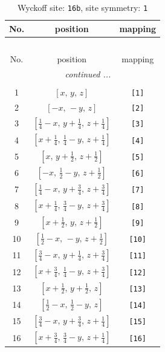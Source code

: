 \documentclass[fleqn,8pt]{jsarticle}
\begin{document}
\begin{longtable}{ccc}
\caption{Wyckoff site: {\tt 16b}, site symmetry: {\tt 1}}
 \\
 \hline \hline
No. & position & mapping \\ \hline \endfirsthead

\multicolumn{2}{l}{\tablename\ \thetable{}} \\
 \hline \hline
No. & position & mapping \\ \hline \endhead

 \hline \hline
\multicolumn{2}{r}{\footnotesize\it continued ...} \\ \endfoot

 \hline \hline
\multicolumn{2}{r}{} \\ \endlastfoot

1 & $\left[ x,\, y,\, z \right]$ & {\tt [1]} \\ \hline
2 & $\left[ - x,\, - y,\, z \right]$ & {\tt [2]} \\ \hline
3 & $\left[ \frac{1}{4} - x,\, y + \frac{1}{4},\, z + \frac{1}{4} \right]$ & {\tt [3]} \\ \hline
4 & $\left[ x + \frac{1}{4},\, \frac{1}{4} - y,\, z + \frac{1}{4} \right]$ & {\tt [4]} \\ \hline
5 & $\left[ x,\, y + \frac{1}{2},\, z + \frac{1}{2} \right]$ & {\tt [5]} \\ \hline
6 & $\left[ - x,\, \frac{1}{2} - y,\, z + \frac{1}{2} \right]$ & {\tt [6]} \\ \hline
7 & $\left[ \frac{1}{4} - x,\, y + \frac{3}{4},\, z + \frac{3}{4} \right]$ & {\tt [7]} \\ \hline
8 & $\left[ x + \frac{1}{4},\, \frac{3}{4} - y,\, z + \frac{3}{4} \right]$ & {\tt [8]} \\ \hline
9 & $\left[ x + \frac{1}{2},\, y,\, z + \frac{1}{2} \right]$ & {\tt [9]} \\ \hline
10 & $\left[ \frac{1}{2} - x,\, - y,\, z + \frac{1}{2} \right]$ & {\tt [10]} \\ \hline
11 & $\left[ \frac{3}{4} - x,\, y + \frac{1}{4},\, z + \frac{3}{4} \right]$ & {\tt [11]} \\ \hline
12 & $\left[ x + \frac{3}{4},\, \frac{1}{4} - y,\, z + \frac{3}{4} \right]$ & {\tt [12]} \\ \hline
13 & $\left[ x + \frac{1}{2},\, y + \frac{1}{2},\, z \right]$ & {\tt [13]} \\ \hline
14 & $\left[ \frac{1}{2} - x,\, \frac{1}{2} - y,\, z \right]$ & {\tt [14]} \\ \hline
15 & $\left[ \frac{3}{4} - x,\, y + \frac{3}{4},\, z + \frac{1}{4} \right]$ & {\tt [15]} \\ \hline
16 & $\left[ x + \frac{3}{4},\, \frac{3}{4} - y,\, z + \frac{1}{4} \right]$ & {\tt [16]} \\
\end{longtable}
\end{document}
